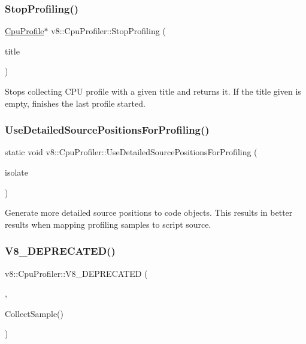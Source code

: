 \subsubsection{\texorpdfstring{Stop\+Profiling()}{StopProfiling()}}
{\footnotesize\ttfamily \mbox{\hyperlink{classv8_1_1CpuProfile}{Cpu\+Profile}}$\ast$ v8\+::\+Cpu\+Profiler\+::\+Stop\+Profiling (\begin{DoxyParamCaption}\item[{\mbox{\hyperlink{classv8_1_1Local}{Local}}$<$ \mbox{\hyperlink{classv8_1_1String}{String}} $>$}]{title }\end{DoxyParamCaption})}

Stops collecting C\+PU profile with a given title and returns it. If the title given is empty, finishes the last profile started. \mbox{\label{classv8_1_1CpuProfiler_ae62325c49592ebdc030fbcf21e470c16}} 
\subsubsection{\texorpdfstring{Use\+Detailed\+Source\+Positions\+For\+Profiling()}{UseDetailedSourcePositionsForProfiling()}}
{\footnotesize\ttfamily static void v8\+::\+Cpu\+Profiler\+::\+Use\+Detailed\+Source\+Positions\+For\+Profiling (\begin{DoxyParamCaption}\item[{Isolate $\ast$}]{isolate }\end{DoxyParamCaption})\hspace{0.3cm}{\ttfamily [static]}}

Generate more detailed source positions to code objects. This results in better results when mapping profiling samples to script source. \mbox{\label{classv8_1_1CpuProfiler_a8ddea26e13e631875cb41dcb2563ff40}} 
\subsubsection{\texorpdfstring{V8\+\_\+\+D\+E\+P\+R\+E\+C\+A\+T\+E\+D()}{V8\_DEPRECATED()}\hspace{0.1cm}{\footnotesize\ttfamily [1/2]}}
{\footnotesize\ttfamily v8\+::\+Cpu\+Profiler\+::\+V8\+\_\+\+D\+E\+P\+R\+E\+C\+A\+T\+ED (\begin{DoxyParamCaption}\item[{\char`\"{}Use static \mbox{\hyperlink{classv8_1_1CpuProfiler_a88b787078f0c8742b3c077af0de4f46b}{Collect\+Sample}}(Isolate$\ast$) instead.\char`\"{}}]{,  }\item[{void }]{Collect\+Sample() }\end{DoxyParamCaption})}

